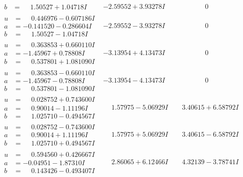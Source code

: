 \documentclass[1p]{elsarticle_modified}
\theoremstyle{definition}
\begin{document}
$$\begin{array}{c|c|c}
\begin{aligned}
b &= \phantom{-}1.50527 + 1.04718 I\end{aligned}
 & -2.59552 + 3.93278 I & \phantom{-0.000000 } 0 \\ \hline\begin{aligned}
u &= \phantom{-}0.446976 - 0.607186 I \\
a &= -0.141520 - 0.286604 I \\
b &= \phantom{-}1.50527 - 1.04718 I\end{aligned}
 & -2.59552 - 3.93278 I & \phantom{-0.000000 } 0 \\ \hline\begin{aligned}
u &= \phantom{-}0.363853 + 0.660110 I \\
a &= -1.45967 + 0.78808 I \\
b &= \phantom{-}0.537801 + 1.081090 I\end{aligned}
 & -3.13954 + 4.13473 I & \phantom{-0.000000 } 0 \\ \hline\begin{aligned}
u &= \phantom{-}0.363853 - 0.660110 I \\
a &= -1.45967 - 0.78808 I \\
b &= \phantom{-}0.537801 - 1.081090 I\end{aligned}
 & -3.13954 - 4.13473 I & \phantom{-0.000000 } 0 \\ \hline\begin{aligned}
u &= \phantom{-}0.028752 + 0.743600 I \\
a &= \phantom{-}0.90014 - 1.11196 I \\
b &= \phantom{-}1.025710 - 0.494567 I\end{aligned}
 & \phantom{-}1.57975 - 5.06929 I & \phantom{-}3.40615 + 6.58792 I \\ \hline\begin{aligned}
u &= \phantom{-}0.028752 - 0.743600 I \\
a &= \phantom{-}0.90014 + 1.11196 I \\
b &= \phantom{-}1.025710 + 0.494567 I\end{aligned}
 & \phantom{-}1.57975 + 5.06929 I & \phantom{-}3.40615 - 6.58792 I \\ \hline\begin{aligned}
u &= \phantom{-}0.594560 + 0.426667 I \\
a &= -0.04951 - 1.87310 I \\
b &= \phantom{-}0.143426 - 0.493407 I\end{aligned}
 & \phantom{-}2.86065 + 6.12466 I & \phantom{-}4.32139 - 3.78741 I \\ \hline\begin{aligned}

\end{aligned}
\end{array}$$
\end{document}
